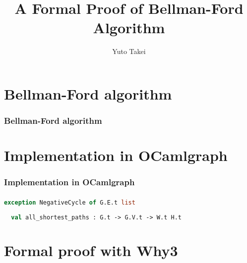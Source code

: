 \documentclass{beamer}
\begin{document}
\title{A Formal Proof of Bellman-Ford Algorithm}
\author[Yuto Takei]{Yuto Takei}

\maketitle

\begin{frame}
  \tableofcontents
\end{frame}

\section{Bellman-Ford algorithm}

\begin{frame}\frametitle{Bellman-Ford algorithm}


\end{frame}

\begin{frame}\frametitle{}

\end{frame}

\begin{frame}\frametitle{}

\end{frame}

\section{Implementation in OCamlgraph}

\begin{frame}\frametitle{Implementation in OCamlgraph}
\end{frame}

\begin{frame}[fragile]\frametitle{}
  \begin{lstlisting}[language=Caml]
  exception NegativeCycle of G.E.t list
 
  val all_shortest_paths : G.t -> G.V.t -> W.t H.t
  \end{lstlisting}
\end{frame}


\section{Formal proof with Why3}
\end{document}
